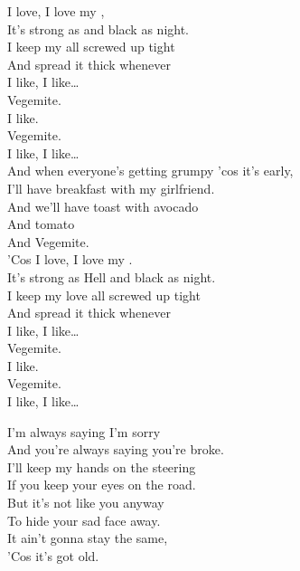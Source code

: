 I love, I love my , \\
It's strong as  and black as night. \\
I keep my  all screwed up tight \\
And spread it thick whenever \\
I like, I like… \\

Vegemite. \\
I like. \\
Vegemite. \\
I like, I like… \\

And when everyone's getting grumpy 'cos it's early, \\
I'll have breakfast with my girlfriend. \\
And we'll have toast with avocado \\
And tomato \\
And Vegemite. \\

'Cos I love, I love my . \\
It's strong as Hell and black as night. \\
I keep my love all screwed up tight \\
And spread it thick whenever \\
I like, I like… \\

Vegemite. \\
I like. \\
Vegemite. \\
I like, I like… \\





I'm always saying I'm sorry \\
And you're always saying you're broke. \\
I'll keep my hands on the steering  \\
If you keep your eyes on the road. \\

But it's not like you anyway \\
To hide your sad face away. \\
It ain't gonna stay the same, \\
'Cos it's got old. \\

